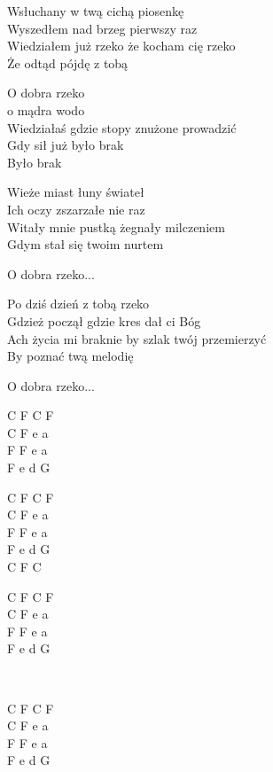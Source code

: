 \begin{textn}
    Wsłuchany w twą cichą piosenkę\\
    Wyszedłem nad brzeg pierwszy raz\\
    Wiedziałem już rzeko że kocham cię rzeko\\
    Że odtąd pójdę z tobą

    \vin O dobra rzeko\\
    \vin o mądra wodo\\
    \vin Wiedziałaś gdzie stopy znużone prowadzić\\
    \vin Gdy sił już było brak\\
    \vin Było brak

    Wieże miast łuny świateł\\
    Ich oczy zszarzałe nie raz\\
    Witały mnie pustką żegnały milczeniem\\
    Gdym stał się twoim nurtem
    
    \vin O dobra rzeko...

    Po dziś dzień z tobą rzeko\\
    Gdzież począł gdzie kres dał ci Bóg\\
    Ach życia mi braknie by szlak twój przemierzyć\\
    By poznać twą melodię
    
    \vin O dobra rzeko...
\end{textn}
\begin{chordw}
    C F C F\\
    C F e a\\
    F F e a\\
    F e d G

    C F C F\\
    C F e a\\
    F F e a\\
    F e d G\\
    C F C

    C F C F\\
    C F e a\\
    F F e a\\
    F e d G
    
    ~

    C F C F\\
    C F e a\\
    F F e a\\
    F e d G
\end{chordw}
